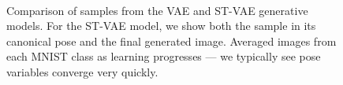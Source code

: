 \begin{figure}[t]
\begin{center}
\,
\vspace{-5mm}
\end{center}
 \caption{\footnotesize
  Comparison of samples from the VAE and ST-VAE generative models.  
 For the ST-VAE model, we show both the sample in its canonical pose and the final generated image.
    Averaged images from each MNIST class as learning progresses ---
  we typically see pose variables converge very quickly.
 }\vspace{-2mm}
\end{figure}



